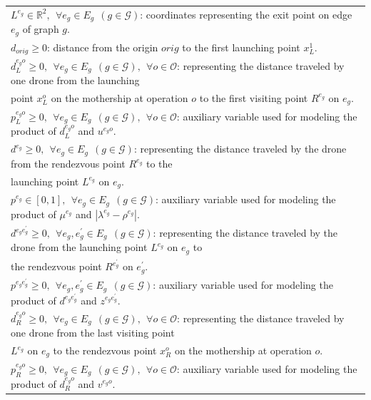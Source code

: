 \documentclass[10pt,a4paper]{elsarticle}
\begin{document}
\begin{table}[h!]
\begin{tabular}{|l|}
	$L^{e_g}\in\mathbb R^2, \:\: \forall e_g \in E_g \:\: (g \in \mathcal{G})$: coordinates representing the exit point on edge $e_g$ of graph $g$.\\
	$d_{orig}\geq 0$: distance from the origin $orig$ to the first launching point $x_L^1$.\\
	$d_L^{e_go} \geq 0, \:\: \forall e_g \in E_g \:\:(g \in \mathcal{G}), \:\:\forall o \in \mathcal O$: representing the distance traveled by one drone from the launching\\
	\hspace*{1cm} point $x_L^o$ on the mothership at operation $o$ to the first visiting point $R^{e_g}$ on $e_g$.\\
	$p_L^{e_go} \geq 0, \:\: \forall e_g \in E_g \:\: (g \in \mathcal{G}), \:\:\forall o \in \mathcal O$: auxiliary variable used for modeling the product of $d_L^{e_go}$ and $u^{e_go}$.\\
	$d^{e_g} \geq 0, \:\: \forall e_g \in E_g \:\: (g \in \mathcal{G})$: representing the distance traveled by the drone from the rendezvous point $R^{e_g}$ to the \\
	\hspace*{1cm} launching point $L^{e_g}$ on $e_g$. \\
	$p^{e_g}\in [0, 1], \:\: \forall e_g \in E_g \:\: (g \in \mathcal G)$: auxiliary variable used for modeling the product of $\mu^{e_g}$ and $|\lambda^{e_g}-\rho^{e_g}|$.\\
	$d^{e_ge^\prime_g} \geq 0, \:\: \forall e_g, e^\prime_g \in E_g \:\:(g \in \mathcal{G})$: representing the distance traveled by the drone from the launching point $L^{e_g}$ on $e_g$ to\\
	\hspace*{1cm}  the rendezvous point $R^{e^\prime_g}$ on $e^\prime_g$.\\
	$p^{e_ge^\prime_g} \geq 0, \:\: \forall e_g, e^\prime_g \in E_g \:\:(g \in \mathcal{G})$: auxiliary variable used for modeling the product of $d^{e_ge^\prime_g}$ and $z^{e_ge^\prime_g}$.\\
	$d_R^{e_go} \geq 0, \:\: \forall e_g \in E_g \:\:(g \in \mathcal{G}), \:\:\forall o \in \mathcal O$: representing the distance traveled by one drone from the last visiting point\\
	\hspace*{1cm} $L^{e_g}$ on $e_g$ to the rendezvous point $x_R^o$ on the mothership at operation $o$.\\
	$p_R^{e_go} \geq 0, \:\: \forall e_g \in E_g \:\:(g \in \mathcal{G}), \:\:\forall o \in \mathcal O$: auxiliary variable used for modeling the product of $d_R^{e_go}$ and $v^{e_go}$.\\

\end{tabular}
\end{table}
\end{document}
